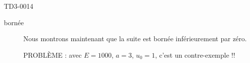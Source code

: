 \begin{corrige}{TD3-0014}
\begin{enumerate}
\begin{description}
        \item[bornée]
            Nous montrons maintenant que la suite est bornée inférieurement par zéro.

            PROBLÈME : avec $E=1000$, \( a=3\), \( u_0=1\), c'est un contre-exemple !!

  \end{description}

  \end{enumerate}

\end{corrige}
